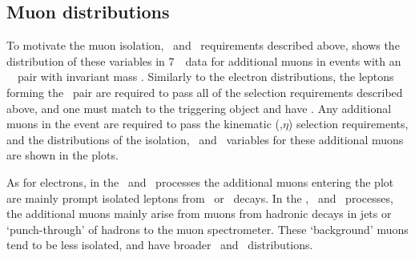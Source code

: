 
\subsection{Muon distributions}

To motivate the muon isolation, \dzerosig\ and \zzero\ requirements described
above,  shows the distribution of these variables in 7~\tev\ data for additional
muons in events with an \ossf\ \dilepton\ pair with invariant mass \sstooos.
Similarly to the electron distributions, the leptons forming the \dilepton\ pair are required to pass all of
the selection requirements described above, and one must match to the triggering
object and have . Any additional muons in the event are required to pass
the kinematic (\pt,$\eta$) selection requirements, and the distributions of the isolation, \dzerosig\ and \zzero\
variables for these additional muons are shown in the plots. 

As for electrons, in the \WZ\ and \ZZ\ processes the additional muons entering
the plot are mainly prompt isolated leptons from \W\ or \Z\ decays. In the \Zll,
\ttbar\ and \WW\ processes, the additional muons mainly arise from muons from
hadronic decays in jets or `punch-through' of hadrons to the muon spectrometer.
These `background' muons tend to be less isolated, and have broader \dzerosig\
and \zzero\ distributions.


